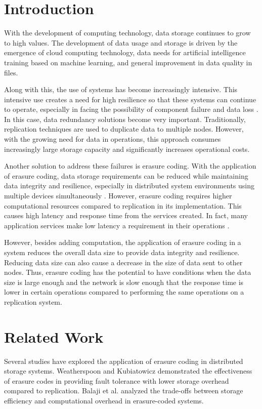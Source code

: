 \section{Introduction}

With the development of computing technology, data storage continues to grow to high values. The development of data usage and storage is driven by the emergence of cloud computing technology, data needs for artificial intelligence training based on machine learning, and general improvement in data quality in files.

Along with this, the use of systems has become increasingly intensive. This intensive use creates a need for high resilience so that these systems can continue to operate, especially in facing the possibility of component failure and data loss \cite{weatherspoon2002erasure}. In this case, data redundancy solutions become very important. Traditionally, replication techniques are used to duplicate data to multiple nodes. However, with the growing need for data in operations, this approach consumes increasingly large storage capacity and significantly increases operational costs.

Another solution to address these failures is erasure coding. With the application of erasure coding, data storage requirements can be reduced while maintaining data integrity and resilience, especially in distributed system environments using multiple devices simultaneously \cite{balaji2018erasure}. However, erasure coding requires higher computational resources compared to replication in its implementation. This causes high latency and response time from the services created. In fact, many application services make low latency a requirement in their operations \cite{dean2013tail}.

However, besides adding computation, the application of erasure coding in a system reduces the overall data size to provide data integrity and resilience. Reducing data size can also cause a decrease in the size of data sent to other nodes. Thus, erasure coding has the potential to have conditions when the data size is large enough and the network is slow enough that the response time is lower in certain operations compared to performing the same operations on a replication system.

\section{Related Work}

Several studies have explored the application of erasure coding in distributed storage systems. Weatherspoon and Kubiatowicz \cite{weatherspoon2002erasure} demonstrated the effectiveness of erasure codes in providing fault tolerance with lower storage overhead compared to replication. Balaji et al. \cite{balaji2018erasure} analyzed the trade-offs between storage efficiency and computational overhead in erasure-coded systems.


